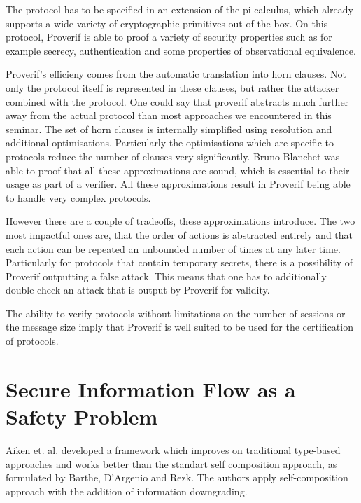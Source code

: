 \documentclass[a4paper,UKenglish]{lipics-v2018}
\begin{document}
The protocol has to be specified in an extension of the pi calculus, which already supports a wide variety of cryptographic primitives out of the box. On this protocol, Proverif is able to proof a variety of security properties such as for example secrecy, authentication and some properties of observational equivalence.\cite{ProVerif}

Proverif's efficieny comes from the automatic translation into horn clauses. Not only the protocol itself is represented in these clauses, but rather the attacker combined with the protocol. One could say that proverif abstracts much further away from the actual protocol than most approaches we encountered in this seminar. The set of horn clauses is internally simplified using resolution and additional optimisations. Particularly the optimisations which are specific to protocols reduce the number of clauses very significantly. Bruno Blanchet was able to proof that all these approximations are sound, which is essential to their usage as part of a verifier. All these approximations result in Proverif being able to handle very complex protocols.\cite{ProVerif}

However there are a couple of tradeoffs, these approximations introduce. The two most impactful ones are, that the order of actions is abstracted entirely and that each action can be repeated an unbounded number of times at any later time. Particularly for protocols that contain temporary secrets, there is a possibility of Proverif outputting a false attack.
This means that one has to additionally double-check an attack that is output by Proverif for validity. \cite{ProVerif}

The ability to verify protocols without limitations on the number of sessions or the message size imply that Proverif is well suited to be used for the certification of protocols.\cite{ProVerif}


\newpage
\section{Secure Information Flow as a Safety Problem}


Aiken et. al. developed a framework which improves on traditional type-based approaches and works better than the standart self composition approach, as formulated by Barthe, D'Argenio and Rezk. The authors apply  self-composition approach with the addition of information downgrading.\cite{secure_information_flow_safety}
\end{document}
